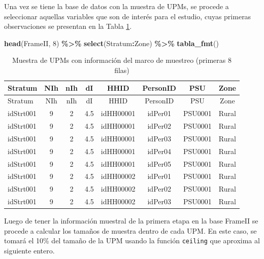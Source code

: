 \documentclass[
  spanish,
  12pt,
]{book}
\newenvironment{Shaded}{\begin{snugshade}}{\end{snugshade}}
\newcommand{\DecValTok}[1]{\textcolor[rgb]{0.00,0.00,0.81}{#1}}
\newcommand{\FunctionTok}[1]{\textcolor[rgb]{0.13,0.29,0.53}{\textbf{#1}}}
\newcommand{\NormalTok}[1]{#1}
\newcommand{\SpecialCharTok}[1]{\textcolor[rgb]{0.81,0.36,0.00}{\textbf{#1}}}
\begin{document}
Una vez se tiene la base de datos con la muestra de UPMs, se procede a seleccionar aquellas variables que son de interés para el estudio, cuyas primeras observaciones se presentan en la Tabla \ref{tab:tab-frameII}.

\begin{Shaded}
\begin{Highlighting}[]
\FunctionTok{head}\NormalTok{(FrameII, }\DecValTok{8}\NormalTok{) }\SpecialCharTok{\%\textgreater{}\%}
  \FunctionTok{select}\NormalTok{(Stratum}\SpecialCharTok{:}\NormalTok{Zone) }\SpecialCharTok{\%\textgreater{}\%}
  \FunctionTok{tabla\_fmt}\NormalTok{()}
\end{Highlighting}
\end{Shaded}

\begin{longtable}[]{@{}lccccccc@{}}
\caption{\label{tab:tab-frameII}Muestra de UPMs con información del marco de muestreo (primeras 8 filas)}\tabularnewline
\toprule\noalign{}
Stratum & NIh & nIh & dI & HHID & PersonID & PSU & Zone \\
\midrule\noalign{}
\endfirsthead
\toprule\noalign{}
Stratum & NIh & nIh & dI & HHID & PersonID & PSU & Zone \\
\midrule\noalign{}
\endhead
\bottomrule\noalign{}
\endlastfoot
idStrt001 & 9 & 2 & 4.5 & idHH00001 & idPer01 & PSU0001 & Rural \\
idStrt001 & 9 & 2 & 4.5 & idHH00001 & idPer02 & PSU0001 & Rural \\
idStrt001 & 9 & 2 & 4.5 & idHH00001 & idPer03 & PSU0001 & Rural \\
idStrt001 & 9 & 2 & 4.5 & idHH00001 & idPer04 & PSU0001 & Rural \\
idStrt001 & 9 & 2 & 4.5 & idHH00001 & idPer05 & PSU0001 & Rural \\
idStrt001 & 9 & 2 & 4.5 & idHH00002 & idPer01 & PSU0001 & Rural \\
idStrt001 & 9 & 2 & 4.5 & idHH00002 & idPer02 & PSU0001 & Rural \\
idStrt001 & 9 & 2 & 4.5 & idHH00002 & idPer03 & PSU0001 & Rural \\
\end{longtable}

Luego de tener la información muestral de la primera etapa en la base FrameII se procede a calcular los tamaños de muestra dentro de cada UPM. En este caso, se tomará el 10\% del tamaño de la UPM usando la función \texttt{ceiling} que aproxima al siguiente entero.
\end{document}
